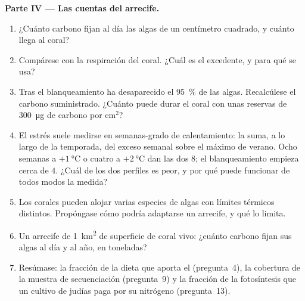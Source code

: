 \begin{problem}
\medskip
\noindent\textbf{Parte IV --- Las cuentas del arrecife.}
\begin{enumerate}[resume]
  \item ¿Cuánto carbono fijan al día las algas de un centímetro
        cuadrado, y cuánto llega al coral?
  \item Compárese con la respiración del coral. ¿Cuál es el excedente, y
        para qué se usa?
  \item Tras el blanqueamiento ha desaparecido el \qty{95}{\%} de las
        algas. Recalcúlese el carbono suministrado. ¿Cuánto puede durar
        el coral con unas reservas de \qty{300}{\micro g} de carbono por
        cm$^{2}$?
  \item El estrés suele medirse en semanas-grado de calentamiento: la
        suma, a lo largo de la temporada, del exceso semanal sobre el
        máximo de verano. Ocho semanas a $+\qty{1}{\celsius}$ o cuatro a
        $+\qty{2}{\celsius}$ dan las dos $8$; el blanqueamiento empieza
        cerca de $4$. ¿Cuál de los dos perfiles es peor, y por qué puede
        funcionar de todos modos la medida?
  \item Los corales pueden alojar varias especies de algas con límites
        térmicos distintos. Propóngase cómo podría adaptarse un
        arrecife, y qué lo limita.
  \item Un arrecife de \qty{1}{km^2} de superficie de coral vivo:
        ¿cuánto carbono fijan sus algas al día y al año, en toneladas?
  \item Resúmase: la fracción de la dieta que aporta el 
        (pregunta~4), la cobertura de la muestra de secuenciación
        (pregunta~9) y la fracción de la fotosíntesis que un cultivo de
        judías paga por su nitrógeno (pregunta~13).
\end{enumerate}
\end{problem}
